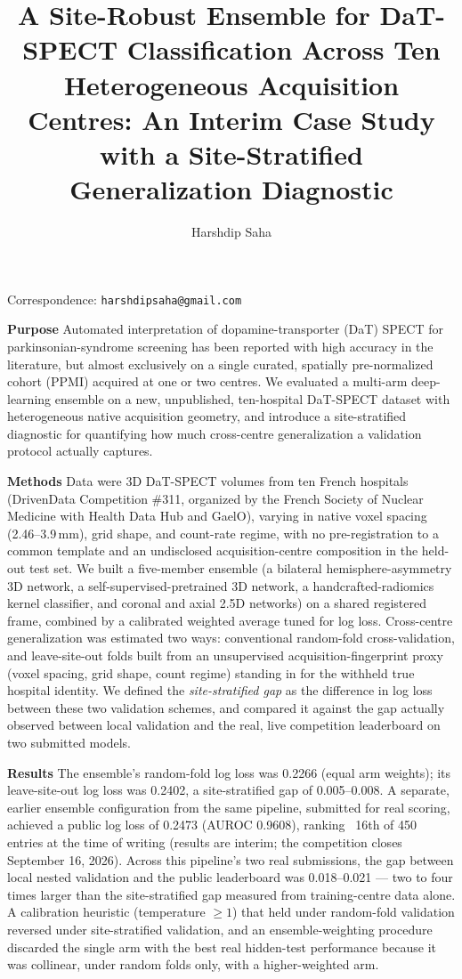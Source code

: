 \documentclass[11pt]{article}
\title{\textbf{A Site-Robust Ensemble for DaT-SPECT Classification Across Ten Heterogeneous Acquisition Centres: An Interim Case Study with a Site-Stratified Generalization Diagnostic}}
\author[1]{Harshdip Saha}
\affil[1]{Independent Researcher}
\date{}
\begin{document}
\maketitle

\begin{center}
\small
Correspondence: \texttt{harshdipsaha@gmail.com}
\end{center}

\bigskip
\noindent\textbf{Purpose} Automated interpretation of dopamine-transporter (DaT) SPECT for parkinsonian-syndrome screening has been reported with high accuracy in the literature, but almost exclusively on a single curated, spatially pre-normalized cohort (PPMI) acquired at one or two centres. We evaluated a multi-arm deep-learning ensemble on a new, unpublished, ten-hospital DaT-SPECT dataset with heterogeneous native acquisition geometry, and introduce a site-stratified diagnostic for quantifying how much cross-centre generalization a validation protocol actually captures.

\smallskip
\noindent\textbf{Methods} Data were 3D DaT-SPECT volumes from ten French hospitals (DrivenData Competition \#311, organized by the French Society of Nuclear Medicine with Health Data Hub and GaelO), varying in native voxel spacing (2.46--3.9\,mm), grid shape, and count-rate regime, with no pre-registration to a common template and an undisclosed acquisition-centre composition in the held-out test set. We built a five-member ensemble (a bilateral hemisphere-asymmetry 3D network, a self-supervised-pretrained 3D network, a handcrafted-radiomics kernel classifier, and coronal and axial 2.5D networks) on a shared registered frame, combined by a calibrated weighted average tuned for log loss. Cross-centre generalization was estimated two ways: conventional random-fold cross-validation, and leave-site-out folds built from an unsupervised acquisition-fingerprint proxy (voxel spacing, grid shape, count regime) standing in for the withheld true hospital identity. We defined the \emph{site-stratified gap} as the difference in log loss between these two validation schemes, and compared it against the gap actually observed between local validation and the real, live competition leaderboard on two submitted models.

\smallskip
\noindent\textbf{Results} The ensemble's random-fold log loss was 0.2266 (equal arm weights); its leave-site-out log loss was 0.2402, a site-stratified gap of 0.005--0.008. A separate, earlier ensemble configuration from the same pipeline, submitted for real scoring, achieved a public log loss of 0.2473 (AUROC 0.9608), ranking ~16th of 450 entries at the time of writing (results are interim; the competition closes September 16, 2026). Across this pipeline's two real submissions, the gap between local nested validation and the public leaderboard was 0.018--0.021 --- two to four times larger than the site-stratified gap measured from training-centre data alone. A calibration heuristic (temperature $\geq 1$) that held under random-fold validation reversed under site-stratified validation, and an ensemble-weighting procedure discarded the single arm with the best real hidden-test performance because it was collinear, under random folds only, with a higher-weighted arm.
\end{document}
